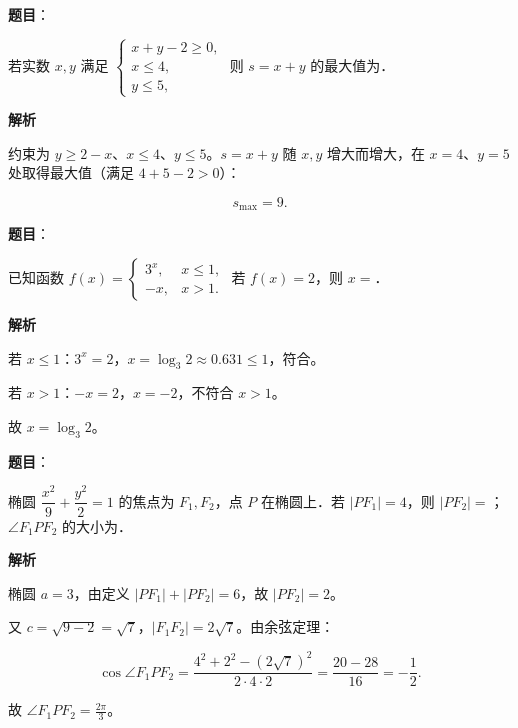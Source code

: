 \begin{answer}

\textbf{题目}：

若实数 $x,y$ 满足 $\begin{cases}x+y-2\geqslant0,\\ x\leqslant4,\\ y\leqslant5,\end{cases}$ 则 $s=x+y$ 的最大值为\gkblank{}．

\textbf{解析}

约束为 $y\geqslant2-x$、$x\leqslant4$、$y\leqslant5$。$s=x+y$ 随 $x,y$ 增大而增大，在 $x=4$、$y=5$ 处取得最大值（满足 $4+5-2>0$）：

\nopagebreak[4]
\[s_{\max}=9 .\]


\end{answer}
\begin{answer}

\textbf{题目}：

已知函数 $f(x)=\begin{cases}3^x,&x\leqslant1,\\ -x,&x>1.\end{cases}$ 若 $f(x)=2$，则 $x=$\gkblank{}．

\textbf{解析}

若 $x\leqslant1$：$3^x=2$，$x=\log_3 2\approx0.631\leqslant1$，符合。

若 $x>1$：$-x=2$，$x=-2$，不符合 $x>1$。

故 $x=\log_3 2$。


\end{answer}
\begin{answer}

\textbf{题目}：

椭圆 $\dfrac{x^2}{9}+\dfrac{y^2}{2}=1$ 的焦点为 $F_1,F_2$，点 $P$ 在椭圆上．若 $|PF_1|=4$，则 $|PF_2|=$\gkblank{}；$\angle F_1PF_2$ 的大小为\gkblank{}．

\textbf{解析}

椭圆 $a=3$，由定义 $|PF_1|+|PF_2|=6$，故 $|PF_2|=2$。

又 $c=\sqrt{9-2}=\sqrt7$，$|F_1F_2|=2\sqrt7$。由余弦定理：

\nopagebreak[4]
\[\cos\angle F_1PF_2=\frac{4^2+2^2-(2\sqrt7)^2}{2\cdot4\cdot2}
=\frac{20-28}{16}=-\frac12 .\]

故 $\angle F_1PF_2=\frac{2\pi}{3}$。


\end{answer}
